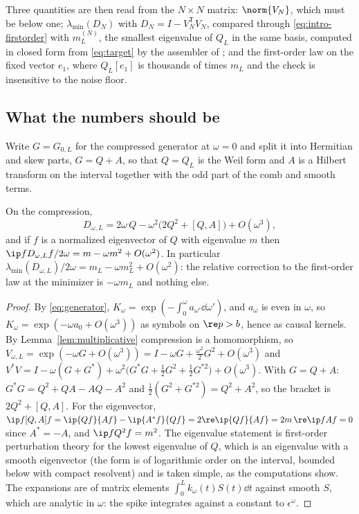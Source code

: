 Three quantities are then read from the $N\times N$ matrix: $\norm{V_N}$, which
must be below one; $\lambda_{\min}(D_N)$ with $D_N=I-V_N^{\mathsf T}V_N$,
compared through \eqref{eq:intro-firstorder} with $m_L^{(N)}$, the smallest
eigenvalue of $Q_L$ in the same basis, computed in closed form from
\eqref{eq:target} by the assembler of \cite{FrameBound}; and the first-order law
on the fixed vector $e_1$, where $Q_L[e_1]$ is thousands of times $m_L$ and the
check is insensitive to the noise floor.

\subsection{What the numbers should be}\label{sec:theory}

Write $G=G_{0,L}$ for the compressed generator at $\omega=0$ and split it into
Hermitian and skew parts, $G=Q+A$, so that $Q=Q_L$ is the Weil form and $A$ is
a Hilbert transform on the interval together with the odd part of the comb and
smooth terms.

\begin{proposition}\label{prop:secondorder}
On the compression,
\begin{equation}\label{eq:secondorder}
 D_{\omega,L}=2\omega\,Q-\omega^2\big(2Q^2+[Q,A]\big)+O(\omega^3),
\end{equation}
and if $f$ is a normalized eigenvector of $Q$ with eigenvalue $m$ then
$\ip f{D_{\omega,L}f}/2\omega=m-\omega m^2+O(\omega^2)$. In particular
$\lambda_{\min}(D_{\omega,L})/2\omega=m_L-\omega m_L^2+O(\omega^2)$: the relative
correction to the first-order law at the minimizer is $-\omega m_L$ and
nothing else.
\end{proposition}
\begin{proof}
By \eqref{eq:generator}, $K_\omega=\exp(-\int_0^\omega a_{\omega'}\dd\omega')$,
and $a_\omega$ is even in $\omega$, so $K_\omega=\exp(-\omega a_0+O(\omega^3))$
as symbols on $\re p>b$, hence as causal kernels. By
Lemma~\ref{lem:multiplicative} compression is a homomorphism, so
$V_{\omega,L}=\exp(-\omega G+O(\omega^3))=I-\omega G+\frac{\omega^2}2G^2+O(\omega^3)$
and
$V^*V=I-\omega(G+G^*)+\omega^2\big(G^*G+\frac12G^2+\frac12G^{*2}\big)+O(\omega^3)$.
With $G=Q+A$: $G^*G=Q^2+QA-AQ-A^2$ and $\frac12(G^2+G^{*2})=Q^2+A^2$, so the
bracket is $2Q^2+[Q,A]$. For the eigenvector,
$\ip f{[Q,A]f}=\ip{Qf}{Af}-\ip{A^*f}{Qf}=2\re\ip{Qf}{Af}=2m\,\re\ip f{Af}=0$ since $A^*=-A$,
and $\ip f{Q^2f}=m^2$. The eigenvalue statement is first-order perturbation
theory for the lowest eigenvalue of $Q$, which is an eigenvalue with a smooth
eigenvector (the form is of logarithmic order on the interval, bounded below
with compact resolvent) and is taken simple, as the computations show. The
expansions are of matrix elements $\int_0^Lk_\omega(t)S(t)\dd t$ against smooth
$S$, which are analytic in $\omega$: the spike integrates against a constant to
$\epsilon^\omega$.
\end{proof}

